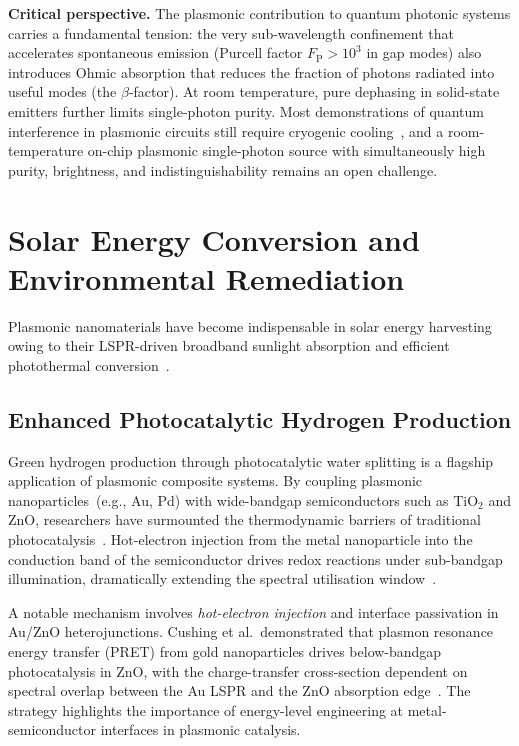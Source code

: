 \documentclass[twocolumn,10pt]{article}
\begin{document}
\noindent\textbf{Critical perspective.}  The plasmonic contribution to
quantum photonic systems carries a fundamental tension: the very
sub-wavelength confinement that accelerates spontaneous emission
(Purcell factor $F_\mathrm{P} > 10^3$ in gap modes) also introduces
Ohmic absorption that reduces the fraction of photons radiated into
useful modes (the $\beta$-factor).  At room temperature, pure dephasing
in solid-state emitters further limits single-photon purity.  Most
demonstrations of quantum interference in plasmonic circuits still
require cryogenic cooling~\cite{heeres2013quantum}, and a
room-temperature on-chip plasmonic single-photon source with
simultaneously high purity, brightness, and indistinguishability
remains an open challenge.

\section{Solar Energy Conversion and Environmental Remediation}
\label{sec:solar}

Plasmonic nanomaterials have become indispensable in solar energy
harvesting owing to their LSPR-driven broadband sunlight absorption and
efficient photothermal conversion~\cite{linic2011plasmonic}.

\subsection{Enhanced Photocatalytic Hydrogen Production}

Green hydrogen production through photocatalytic water splitting is a
flagship application of plasmonic composite systems.  By coupling
plasmonic nanoparticles~(e.g., Au, Pd) with wide-bandgap semiconductors
such as TiO$_2$ and ZnO, researchers have surmounted the thermodynamic
barriers of traditional photocatalysis~\cite{linic2011plasmonic,cushing2012photocatalytic}.
Hot-electron injection from the metal nanoparticle into the conduction
band of the semiconductor drives redox reactions under sub-bandgap
illumination, dramatically extending the spectral utilisation
window~\cite{cushing2012photocatalytic}.

A notable mechanism involves \textit{hot-electron injection} and
interface passivation in Au/ZnO heterojunctions.  Cushing et
al.\ demonstrated that plasmon resonance energy transfer (PRET) from
gold nanoparticles drives below-bandgap photocatalysis in ZnO,
with the charge-transfer cross-section dependent on spectral overlap
between the Au LSPR and the ZnO absorption
edge~\cite{cushing2012photocatalytic}.  The strategy highlights the
importance of energy-level engineering at metal-semiconductor
interfaces in plasmonic catalysis.
\end{document}
